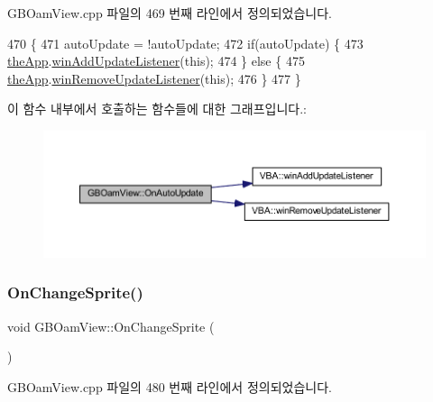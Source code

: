 G\+B\+Oam\+View.\+cpp 파일의 469 번째 라인에서 정의되었습니다.


\begin{DoxyCode}
470 \{
471   autoUpdate = !autoUpdate;
472   \textcolor{keywordflow}{if}(autoUpdate) \{
473     \mbox{\hyperlink{_v_b_a_8cpp_a8095a9d06b37a7efe3723f3218ad8fb3}{theApp}}.\mbox{\hyperlink{class_v_b_a_af0712f70a90d023ab8327a366be08174}{winAddUpdateListener}}(\textcolor{keyword}{this});
474   \} \textcolor{keywordflow}{else} \{
475     \mbox{\hyperlink{_v_b_a_8cpp_a8095a9d06b37a7efe3723f3218ad8fb3}{theApp}}.\mbox{\hyperlink{class_v_b_a_a2d31a0656df2230310aa8dc9e3a735d3}{winRemoveUpdateListener}}(\textcolor{keyword}{this});    
476   \}  
477 \}
\end{DoxyCode}
이 함수 내부에서 호출하는 함수들에 대한 그래프입니다.\+:
\nopagebreak
\begin{figure}[H]
\begin{center}
\leavevmode
\includegraphics[width=350pt]{class_g_b_oam_view_a2c508aeb9089bfb1a21f88bd92c6753d_cgraph}
\end{center}
\end{figure}
\mbox{\label{class_g_b_oam_view_aabd5dcff93f2d91fbc979853123cd30f}} 
\subsubsection{\texorpdfstring{On\+Change\+Sprite()}{OnChangeSprite()}}
{\footnotesize\ttfamily void G\+B\+Oam\+View\+::\+On\+Change\+Sprite (\begin{DoxyParamCaption}{ }\end{DoxyParamCaption})\hspace{0.3cm}{\ttfamily [protected]}}



G\+B\+Oam\+View.\+cpp 파일의 480 번째 라인에서 정의되었습니다.


